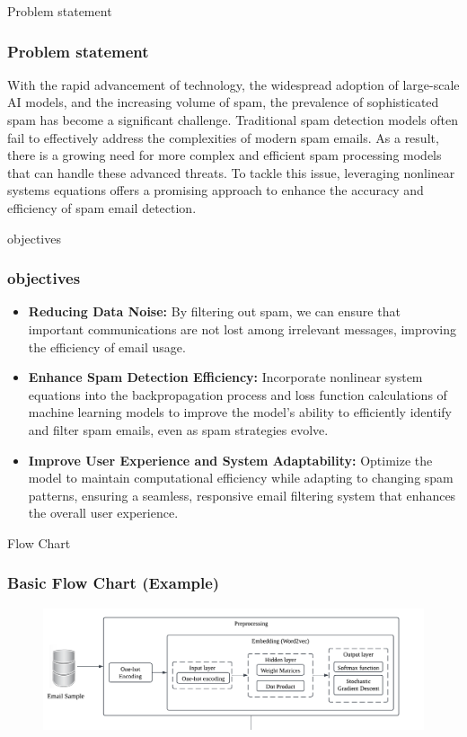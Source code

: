 \documentclass[aspectratio=1610]{beamer}
\begin{document}
\begin{frame}{Problem statement}
    \frametitle{Problem statement}
    With the rapid advancement of technology, the widespread adoption of large-scale AI models, and the increasing volume of spam, the prevalence of sophisticated spam has become a significant challenge. Traditional spam detection models often fail to effectively address the complexities of modern spam emails. As a result, there is a growing need for more complex and efficient spam processing models that can handle these advanced threats. To tackle this issue, leveraging nonlinear systems equations offers a promising approach to enhance the accuracy and efficiency of spam email detection.    
    
\end{frame}


\begin{frame}{objectives}
    \frametitle{objectives}
    \begin{itemize}
        \item \textbf{Reducing Data Noise: }By filtering out spam, we can ensure that important communications are not lost among irrelevant messages, improving the efficiency of email usage.
        \item\textbf{Enhance Spam Detection Efficiency: }Incorporate nonlinear system equations into the backpropagation process and loss function calculations of machine learning models to improve the model's ability to efficiently identify and filter spam emails, even as spam strategies evolve.
        \item\textbf{Improve User Experience and System Adaptability: } Optimize the model to maintain computational efficiency while adapting to changing spam patterns, ensuring a seamless, responsive email filtering system that enhances the overall user experience.
    \end{itemize}
    
\end{frame}


\begin{frame}{Flow Chart}
    \frametitle{Basic Flow Chart (Example)}
    \begin{figure}
        \centering
        \includegraphics[width = 1.1\linewidth]{NA (1)[2]}
        \label{fig:figure}
    \end{figure}
    
\end{frame}
\end{document}
